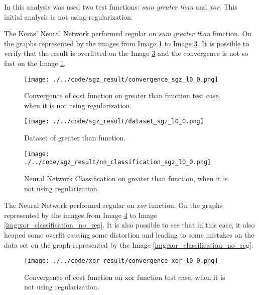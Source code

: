 \documentclass[journal]{IEEEtran}
\begin{document}
In this analysis was used two test functions: \textit{sum greater than} and \textit{xor}. This initial analysis is not using regularization.

The Keras' Neural Network performed regular on \textit{sum greater than} function. On the graphs represented by the images from Image \ref{img:greater_cost_no_reg} to Image \ref{img:greater_classification_no_reg}. It is possible to verify that the result is overfitted on the Image \ref{img:greater_classification_no_reg} and the convergence is not so fast on the Image \ref{img:greater_cost_no_reg}.

\begin{figure}
  \begin{center}
  \texttt{[image: ./../code/sgz\_result/convergence\_sgz\_l0\_0.png]}
  \caption{Convergence of cost function on greater than function test case, when it is not using regularization.}
  \label{img:greater_cost_no_reg}
  \end{center}
\end{figure}

\begin{figure}
  \begin{center}
  \texttt{[image: ./../code/sgz\_result/dataset\_sgz\_l0\_0.png]}
  \caption{Dataset of greater than function.}
  \label{img:greater_data_set}
  \end{center}
\end{figure}

\begin{figure}
    \begin{center}
    \texttt{[image: ./../code/sgz\_result/nn\_classification\_sgz\_l0\_0.png]}
    \caption{Neural Network Classification on greater than function, when it is not using regularization.}
    \label{img:greater_classification_no_reg}
    \end{center}
\end{figure}

The Neural Network performed regular on \textit{xor} function. On the graphs represented by the images from Image \ref{img:xor_cost_no_reg} to Image \ref{img:xor_classification_no_reg}. It is also possible to see that in this case, it also heaped some overfit causing some distortion and leading to some mistakes on the data set on the graph represented by the Image \ref{img:xor_classification_no_reg}.

\begin{figure}
  \begin{center}
  \texttt{[image: ./../code/xor\_result/convergence\_xor\_l0\_0.png]}
  \caption{Convergence of cost function on xor function test case, when it is not using regularization.}
  \label{img:xor_cost_no_reg}
  \end{center}
\end{figure}
\end{document}
